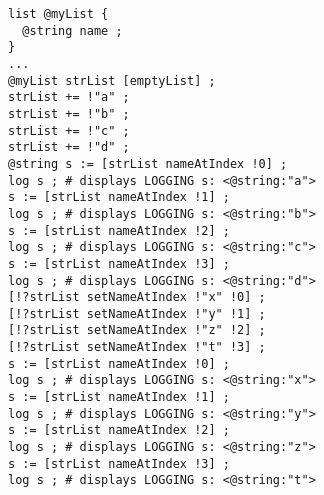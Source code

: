 \begin{lstlisting}[language=galgas]
list @myList {
  @string name ;
}
...
@myList strList [emptyList] ;
strList += !"a" ;
strList += !"b" ;
strList += !"c" ;
strList += !"d" ;
@string s := [strList nameAtIndex !0] ;
log s ; # displays LOGGING s: <@string:"a">
s := [strList nameAtIndex !1] ;
log s ; # displays LOGGING s: <@string:"b">
s := [strList nameAtIndex !2] ;
log s ; # displays LOGGING s: <@string:"c">
s := [strList nameAtIndex !3] ;
log s ; # displays LOGGING s: <@string:"d">
[!?strList setNameAtIndex !"x" !0] ;
[!?strList setNameAtIndex !"y" !1] ;
[!?strList setNameAtIndex !"z" !2] ;
[!?strList setNameAtIndex !"t" !3] ;
s := [strList nameAtIndex !0] ;
log s ; # displays LOGGING s: <@string:"x">
s := [strList nameAtIndex !1] ;
log s ; # displays LOGGING s: <@string:"y">
s := [strList nameAtIndex !2] ;
log s ; # displays LOGGING s: <@string:"z">
s := [strList nameAtIndex !3] ;
log s ; # displays LOGGING s: <@string:"t">
\end{lstlisting}

